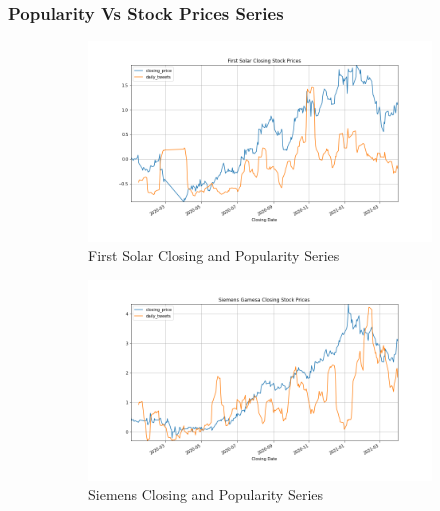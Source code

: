 \documentclass[sigconf, nonacm]{acmart}
\begin{document}
\subsubsection{Popularity  Vs Stock Prices Series} 
\begin{figure}[H]
\centering
   \begin{subfigure}[b]{0.5\textwidth}
   \includegraphics[width=\textwidth]{popularity_time_series/First Solar Closing Stock Prices_closing_price_daily_tweets.png} 
   \caption{First Solar Closing and Popularity Series}
   \label{fig:Ng1} 
\end{subfigure}
\centering
   \begin{subfigure}[b]{0.5\textwidth}
   \includegraphics[width=\textwidth]{popularity_time_series/Siemens Gamesa Closing Stock Prices_closing_price_daily_tweets.png} 
   \caption{Siemens Closing and Popularity Series}
   \label{fig:Ng1} 
\end{subfigure}
\centering
   \begin{subfigure}[b]{0.5\textwidth}

\end{subfigure}
\end{figure}
\end{document}
